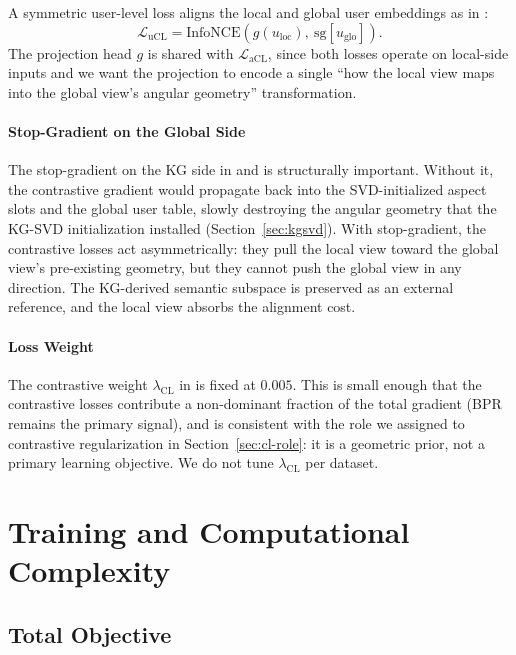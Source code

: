 A symmetric user-level loss aligns the local and global user embeddings as in :
\begin{equation}
\label{eq:lucl}
\mathcal{L}_{\mathrm{uCL}} = \mathrm{InfoNCE}\!\left( g(u_{\mathrm{loc}}),\ \mathrm{sg}\!\left[u_{\mathrm{glo}}\right] \right).
\end{equation}
The projection head $g$ is shared with $\mathcal{L}_{\mathrm{aCL}}$, since both losses operate on local-side inputs and we want the projection to encode a single ``how the local view maps into the global view's angular geometry'' transformation.

\paragraph{Stop-Gradient on the Global Side}
\label{sec:cl-stopgrad}

The stop-gradient on the KG side in  and  is structurally important. Without it, the contrastive gradient would propagate back into the SVD-initialized aspect slots and the global user table, slowly destroying the angular geometry that the KG-SVD initialization installed (Section~\ref{sec:kgsvd}). With stop-gradient, the contrastive losses act asymmetrically: they pull the local view toward the global view's pre-existing geometry, but they cannot push the global view in any direction. The KG-derived semantic subspace is preserved as an external reference, and the local view absorbs the alignment cost.

\paragraph{Loss Weight}
\label{sec:cl-lambda}

The contrastive weight $\lambda_{\mathrm{CL}}$ in  is fixed at $0.005$. This is small enough that the contrastive losses contribute a non-dominant fraction of the total gradient (BPR remains the primary signal), and is consistent with the role we assigned to contrastive regularization in Section~\ref{sec:cl-role}: it is a geometric prior, not a primary learning objective. We do not tune $\lambda_{\mathrm{CL}}$ per dataset.

\section{Training and Computational Complexity}
\label{sec:method-train}

\subsection{Total Objective}
\label{sec:train-objective}

